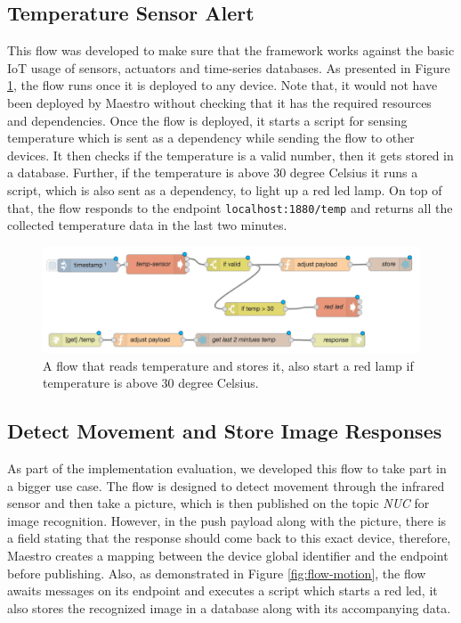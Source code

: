 \subsection{Temperature Sensor Alert}\label{susbec:temp}
This flow was developed to make sure that the  framework works against the basic IoT usage of sensors, actuators and time-series databases. As presented in Figure \ref{fig:flow-temp}, the flow runs once it is deployed to any device. Note that, it would not have been deployed by Maestro without checking that it has the required resources and dependencies. Once the flow is deployed, it starts a script for sensing temperature  which is sent as a dependency while sending the flow to other devices. It then checks if the temperature is a valid number, then it gets stored in a database. Further, if the temperature is above 30 degree Celsius it runs a script, which is also sent as a dependency, to light up a red led lamp. On top of that, the flow responds to the endpoint \verb|localhost:1880/temp| and returns all the collected temperature data in the last two minutes.
 \begin{figure}[H]
	\centering
	\includegraphics[scale=0.6]{images/flow-temp.png}
	\caption{A flow that reads temperature and stores it, also start a red lamp if temperature is above 30 degree Celsius.}
	\label{fig:flow-temp}
\end{figure}



\subsection{Detect Movement and Store Image Responses} \label{subsec:detect-move}
As part of the implementation evaluation, we developed this flow to take part in a bigger use case. The flow is designed to detect movement through the infrared sensor and then take a picture, which is then published on the topic \textit{NUC} for image recognition. However, in the push payload along with the picture, there is a field stating that the response should come back to this exact device, therefore, Maestro creates a mapping between the device global identifier and the endpoint before publishing. Also, as demonstrated in Figure \ref{fig:flow-motion}, the flow awaits messages on its endpoint and executes a script which starts a red led, it also stores the recognized image in a database along with its accompanying data. 

